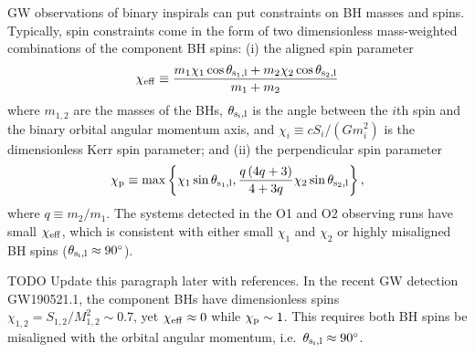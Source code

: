 \documentclass[
        twocolumn,
        twocolappendix
    ]{aastex63}
\newcommand*{\p}[1]{\left(#1\right)}
\newcommand*{\z}[1]{\left\{#1\right\}}
\begin{document}
GW observations of binary inspirals can put constraints on BH masses and spins.
Typically, spin constraints come in the form of two dimensionless mass-weighted
combinations of the component BH spins: (i) the aligned spin parameter
\begin{equation}
    \chi_{\rm eff} \equiv \frac{m_1 \chi_1 \cos \theta_{\rm s_1, l}
            + m_2 \chi_2 \cos \theta_{\rm s_2, l}}{m_1 + m_2}
\end{equation}
where $m_{1,2}$ are the masses of the BHs, $\theta_{\rm s_i, l}$ is the angle
between the $i$th spin and the binary orbital angular momentum axis, and
$\chi_i \equiv cS_i / (Gm_i^2)$ is the dimensionless Kerr spin parameter; and
(ii) the perpendicular spin parameter \citep{schmidt2015towards}
\begin{equation}
    \chi_{\rm p} \equiv \max\z{
        \chi_1 \sin \theta_{\rm s_1,l}, \frac{q\p{4q + 3}}{4 + 3q} \chi_2 \sin
        \theta_{\rm s_2,l}},
\end{equation}
where $q \equiv m_2 / m_1$. The systems detected in the O1 and O2 observing runs
have small $\chi_{\rm eff}$, which is consistent with either small $\chi_1$ and
$\chi_2$ or highly misaligned BH spins ($\theta_{\rm s_i, l} \approx 90^\circ$).

\textcolor{Corr}{TODO Update this paragraph later with references.} In the
recent GW detection GW190521.1, the component BHs have dimensionless spins
$\chi_{1, 2} = S_{1,2} / M_{1, 2}^2 \sim 0.7$, yet $\chi_{\rm eff} \approx 0$
while $\chi_{\rm p} \sim 1$. This requires both BH spins be misaligned with the
orbital angular momentum, i.e.\ $\theta_{\rm s_i, l} \approx 90^\circ$.
\end{document}

